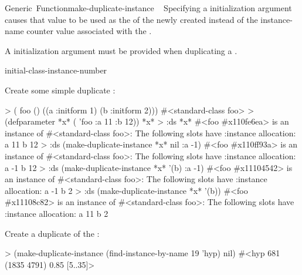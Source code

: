 \documentclass[10pt,twoside,english,pdftex]{article}
\begin{document}
\begin{functiondoc}{Generic~Function}{make-duplicate-instance}{%
     
     
    \mbox{\returns{} }}
Specifying a  initialization argument
causes that value to be used as the  of the newly created
 instead of the instance-name counter value associated
with the . 

A  initialization argument must be provided when
duplicating a .

\begin{alsos}{initial-class-instance-number}
\end{alsos}

\fnexamples
Create some simple duplicate :
%
%
%
%
\W\supp
\begin{example}
> ( foo () 
     ((a :initform 1)
      (b :initform 2)))
#<standard-class foo>
> (defparameter *x* ( 'foo :a 11 :b 12))
*x*
> :ds *x*
#<foo #x110fe6ea> is an instance of #<standard-class foo>:
 The following slots have :instance allocation:
  a   11
  b   12
> :ds (make-duplicate-instance *x* nil :a -1)
#<foo #x110ff93a> is an instance of #<standard-class foo>:
 The following slots have :instance allocation:
  a   -1
  b   12\goodpagebreak
> :ds (make-duplicate-instance *x* '(b) :a -1)
#<foo #x11104542> is an instance of #<standard-class foo>:
 The following slots have :instance allocation:
  a   -1
  b   2
> :ds (make-duplicate-instance *x* '(b))
#<foo #x11108c82> is an instance of #<standard-class foo>:
 The following slots have :instance allocation:
  a   11
  b   2
\end{example}

Create a duplicate of the   :
%
\W\supp
\begin{example}
> (make-duplicate-instance (find-instance-by-name 19 'hyp) nil)
#<hyp 681 (1835 4791) 0.85 [5..35]>
\end{example}

\end{functiondoc}

\end{document}
